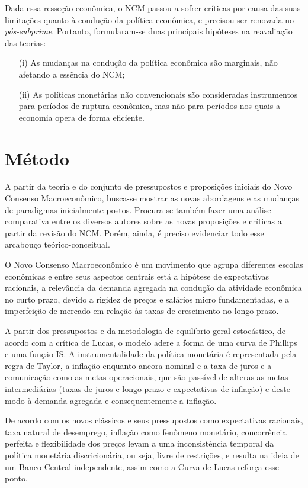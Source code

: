 \documentclass[report]{uftex}
\begin{document}
Dada essa resseção econômica, o NCM passou a sofrer críticas por causa das suas limitações quanto à condução da política econômica, e precisou ser renovada no \textit{pós-subprime}. Portanto, formularam-se duas principais hipóteses na reavaliação das teorias:

\begin{itemize}
\item[(i)] As mudanças na condução da política econômica são marginais, não afetando a essência do NCM;

\item[(ii)] As políticas monetárias não  convencionais são consideradas instrumentos para períodos de ruptura econômica, mas não para períodos nos quais a economia opera de forma eficiente. 	
\end{itemize}

\section{Método}

A partir da teoria e do conjunto de pressupostos e proposições iniciais do Novo Consenso Macroeconômico, busca-se mostrar as novas abordagens e as mudanças de paradigmas inicialmente postos. Procura-se também fazer uma análise comparativa entre os diversos autores sobre as novas proposições e críticas a partir da revisão do NCM. Porém, ainda, é preciso evidenciar todo esse arcabouço teórico-conceitual. 

O Novo Consenso Macroeconômico é um movimento que agrupa diferentes escolas econômicas e entre seus aspectos centrais está a hipótese de expectativas racionais, a relevância da demanda agregada na condução da atividade econômica no curto prazo, devido a rigidez de preços e salários micro fundamentadas, e a imperfeição de mercado em relação às taxas de crescimento no longo prazo. 

A partir dos pressupostos e da metodologia de equilíbrio geral estocástico, de acordo com a crítica de Lucas, o modelo adere a forma de uma curva de Phillips e uma função IS. A instrumentalidade da política monetária é representada pela regra de Taylor, a inflação enquanto ancora nominal e a taxa de juros e a comunicação como as metas operacionais, que são passível de alteras as metas intermediárias (taxas de juros e longo prazo e expectativas de inflação) e deste modo à demanda agregada e consequentemente a inflação. 

De acordo com os novos clássicos e seus pressupostos como expectativas racionais, taxa natural de desemprego, inflação como fenômeno monetário, concorrência perfeita e flexibilidade dos preços levam a uma inconsistência temporal da política monetária discricionária, ou seja, livre de restrições, e resulta na ideia de um Banco Central independente, assim como a Curva de Lucas reforça esse ponto.
\end{document}
